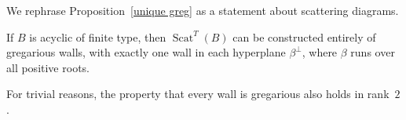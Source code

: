 \documentclass[ALCO,ThmDefs,Unicode,epreuves]{cedram}
\DeclareMathOperator{\Scat}{Scat}
\newcommand{\ck}{\spcheck}
\begin{document}
We rephrase Proposition~\ref{unique greg} as a statement about scattering diagrams.

\begin{coro}
If $B$ is acyclic of finite type, then $\Scat^T(B)$ can be constructed entirely of gregarious walls, with exactly one wall in each hyperplane $\beta^\perp$, where $\beta$ runs over all positive roots.
\end{coro}

For trivial reasons, the property that every wall is gregarious also holds in rank~$2$.




%
%




\end{document}
